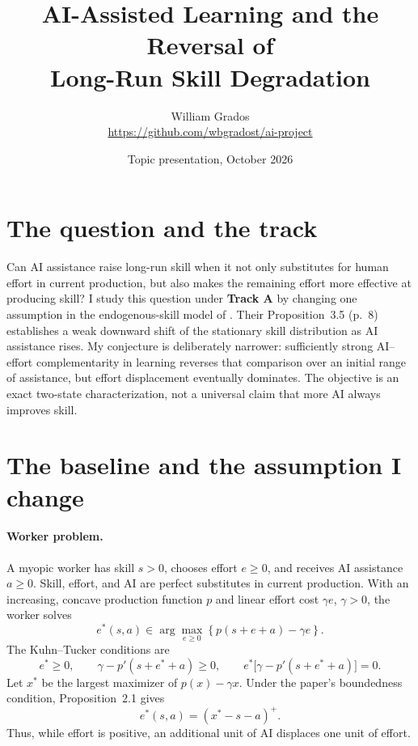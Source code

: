 \documentclass[11pt]{article}
\title{AI-Assisted Learning and the Reversal of\\Long-Run Skill Degradation}
\author{William Grados\\
  \small\url{https://github.com/wbgradost/ai-project}}
\date{Topic presentation, October 2026}
\begin{document}
\maketitle

\section{The question and the track}

Can AI assistance raise long-run skill when it not only substitutes for human
effort in current production, but also makes the remaining effort more
effective at producing skill? I study this question under \textbf{Track A} by
changing one assumption in the endogenous-skill model of
\citet{aouad2026paradoxes}. Their Proposition~3.5 (p.~8) establishes a weak
downward shift of the stationary skill distribution as AI assistance rises. My
conjecture is deliberately narrower: sufficiently strong AI--effort
complementarity in learning reverses that comparison over an initial range of
assistance, but effort displacement eventually dominates. The objective is an
exact two-state characterization, not a universal claim that more AI always
improves skill.

\section{The baseline and the assumption I change}

\paragraph{Worker problem.}
A myopic worker has skill $s>0$, chooses effort $e\geq 0$, and receives AI
assistance $a\geq0$. Skill, effort, and AI are perfect substitutes in current
production. With an increasing, concave production function $p$ and linear
effort cost $\gamma e$, $\gamma>0$, the worker solves
\begin{equation}
  e^*(s,a)\in\arg\max_{e\geq0}
  \left\{p(s+e+a)-\gamma e\right\}.                 \label{eq:worker}
\end{equation}
The Kuhn--Tucker conditions are
\begin{equation}
 e^*\geq0,\qquad
 \gamma-p'(s+e^*+a)\geq0,\qquad
 e^*\bigl[\gamma-p'(s+e^*+a)\bigr]=0.              \label{eq:kkt}
\end{equation}
Let $x^*$ be the largest maximizer of $p(x)-\gamma x$. Under the paper's
boundedness condition, Proposition~2.1 gives
\begin{equation}
 e^*(s,a)=(x^*-s-a)^+ .                              \label{eq:effort}
\end{equation}
Thus, while effort is positive, an additional unit of AI displaces one unit of
effort.
\end{document}
